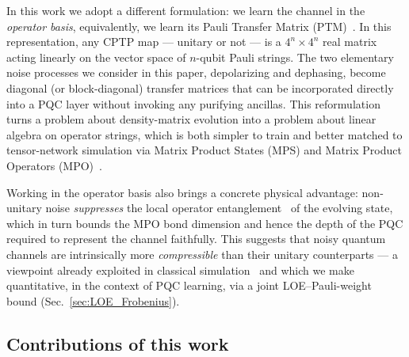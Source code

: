 \documentclass[%
 reprint,
superscriptaddress,
 amsmath,amssymb,
 aps,
]{revtex4-2}
\begin{document}
In this work we adopt a different formulation: we learn the channel in the \emph{operator basis}, equivalently, we learn its Pauli Transfer Matrix (PTM)~\cite{greenbaum2015gst,chow2009randomized}. In this representation, any CPTP map --- unitary or not --- is a $4^n \times 4^n$ real matrix acting linearly on the vector space of $n$-qubit Pauli strings. The two elementary noise processes we consider in this paper, depolarizing and dephasing, become diagonal (or block-diagonal) transfer matrices that can be incorporated directly into a PQC layer without invoking any purifying ancillas. This reformulation turns a problem about density-matrix evolution into a problem about linear algebra on operator strings, which is both simpler to train and better matched to tensor-network simulation via Matrix Product States (MPS) and Matrix Product Operators (MPO)~\cite{schollwoeck2011DMRG,vidal2003slightly}.

Working in the operator basis also brings a concrete physical advantage: non-unitary noise \emph{suppresses} the local operator entanglement~\cite{zanardi2001entanglement,prosen2007operator,LOE_EE_Decreasing1} of the evolving state, which in turn bounds the MPO bond dimension and hence the depth of the PQC required to represent the channel faithfully. This suggests that noisy quantum channels are intrinsically more \emph{compressible} than their unitary counterparts --- a viewpoint already exploited in classical simulation~\cite{LOE_EE_Decreasing1} and which we make quantitative, in the context of PQC learning, via a joint LOE--Pauli-weight bound (Sec.~\ref{sec:LOE_Frobenius}).

\subsection*{Contributions of this work}
\end{document}
